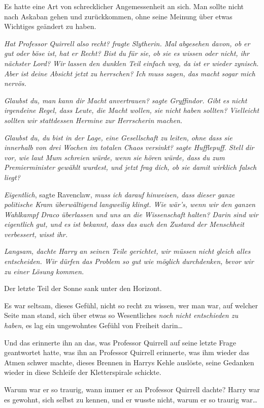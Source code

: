 {Es hatte eine Art von schrecklicher Angemessenheit an sich. Man sollte nicht nach Askaban gehen und zurückkommen, ohne seine Meinung über etwas Wichtiges geändert zu haben.

\emph{\emph{Hat Professor Quirrell also recht}? fragte Slytherin. \emph{Mal abgesehen davon, ob er gut oder böse ist, hat er} Recht\emph{? Bist du für sie, ob sie es wissen oder nicht, ihr nächster Lord? Wir} \emph{lassen den dunklen Teil einfach weg, da ist er wieder zynisch. Aber ist deine Absicht jetzt zu herrschen? Ich muss sagen, das macht sogar} mich \emph{nervös.}}

\emph{\emph{Glaubst du, man kann dir Macht anvertrauen?} sagte Gryffindor. \emph{Gibt es nicht irgendeine Regel, dass Leute, die Macht wollen, sie nicht haben sollten? Vielleicht sollten wir stattdessen Hermine zur Herrscherin machen.}}

\emph{\emph{Glaubst du, du bist in der Lage, eine Gesellschaft zu leiten, ohne dass sie innerhalb von drei Wochen im totalen Chaos versinkt?} sagte Hufflepuff. \emph{Stell dir vor, wie laut Mum schreien würde, wenn sie hören würde, dass du zum Premierminister gewählt wurdest, und jetzt frag dich, ob sie damit wirklich falsch liegt?}}

\emph{Eigentlich}, sagte Ravenclaw, \emph{muss ich darauf hinweisen, dass dieser ganze politische Kram überwältigend langweilig klingt. Wie wär's, wenn wir den ganzen Wahlkampf Draco überlassen und uns an die Wissenschaft halten? Darin sind wir eigentlich gut, und es ist bekannt, dass das auch den Zustand der Menschheit verbessert, wisst ihr.}

\emph{\emph{Langsam}, dachte Harry an seinen Teile gerichtet, \emph{wir müssen nicht gleich alles entscheiden. Wir dürfen das Problem so gut wie möglich durchdenken, bevor wir zu einer Lösung kommen.}}

Der letzte Teil der Sonne sank unter den Horizont.

Es war seltsam, dieses Gefühl, nicht so recht zu wissen, wer man war, auf welcher Seite man stand, sich über etwas so Wesentliches \emph{noch nicht entschieden zu haben}, es lag ein ungewohntes Gefühl von Freiheit darin…

Und das erinnerte ihn an das, was Professor Quirrell auf seine letzte Frage geantwortet hatte, was ihn an Professor Quirrell erinnerte, was ihm wieder das Atmen schwer machte, dieses Brennen in Harrys Kehle auslöste, seine Gedanken wieder in diese Schleife der Kletterspirale schickte.

Warum war er so traurig, wann immer er an Professor Quirrell dachte? Harry war es gewohnt, sich selbst zu kennen, und er wusste nicht, warum er so traurig war…

}
